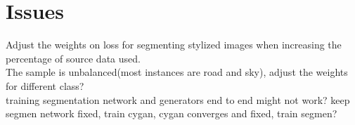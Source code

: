 \documentclass{article}
\begin{document}
\section*{Issues}
Adjust the weights on loss for segmenting stylized images when increasing the percentage of source data used.\\
The sample is unbalanced(most instances are road and sky), adjust the weights for different class?\\
training segmentation network and generators end to end might not work? keep segmen network fixed, train cygan, cygan converges and fixed, train segmen?


\end{document}
